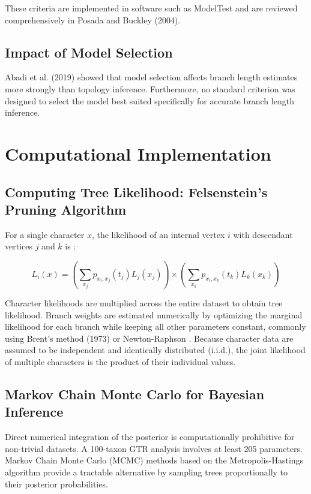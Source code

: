 These criteria are implemented in software such as ModelTest and are reviewed comprehensively in Posada and Buckley (2004).

\subsection{Impact of Model Selection}

Abadi et al. (2019) showed that model selection affects branch length estimates more strongly than topology inference. Furthermore, no standard criterion was designed to select the model best suited specifically for accurate branch length inference.

\section{Computational Implementation}

\subsection{Computing Tree Likelihood: Felsenstein's Pruning Algorithm}

For a single character $x$, the likelihood of an internal vertex $i$ with descendant vertices $j$ and $k$ is \parencite{wheeler2012}:

$$L_i(x) = \left(\sum_{x_j} p_{x_i, x_j}(t_j) L_j(x_j)\right) \times \left(\sum_{x_k} p_{x_i, x_k}(t_k) L_k(x_k)\right)$$

Character likelihoods are multiplied across the entire dataset to obtain tree likelihood. Branch weights are estimated numerically by optimizing the marginal likelihood for each branch while keeping all other parameters constant, commonly using Brent's method (1973) or Newton-Raphson \parencite{ypma1995}. Because character data are assumed to be independent and identically distributed (i.i.d.), the joint likelihood of multiple characters is the product of their individual values.

\subsection{Markov Chain Monte Carlo for Bayesian Inference}

Direct numerical integration of the posterior is computationally prohibitive for non-trivial datasets. A 100-taxon GTR analysis involves at least 205 parameters. Markov Chain Monte Carlo (MCMC) methods based on the Metropolis-Hastings algorithm \parencite{metropolis1953,hastings1970} provide a tractable alternative by sampling trees proportionally to their posterior probabilities.

